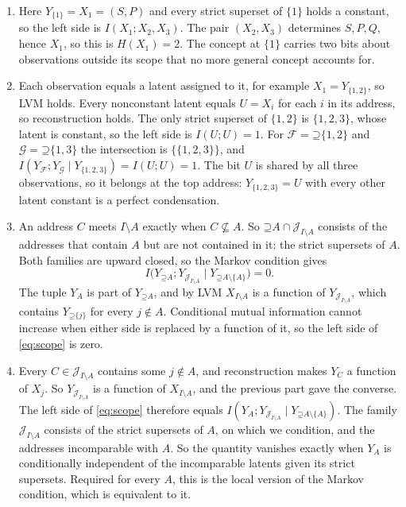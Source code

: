 \documentclass[11pt]{article}
\newcommand{\Up}{\mathord{\supseteq}}
\begin{document}
\begin{solution}[ex:scope]
\begin{enumerate}
\item Here $Y_{\{1\}}=X_1=(S,P)$ and every strict superset of $\{1\}$ holds a
constant, so the left side is $I(X_1;X_2,X_3)$. The pair $(X_2,X_3)$
determines $S,P,Q$, hence $X_1$, so this is $H(X_1)=2$. The concept at
$\{1\}$ carries two bits about observations outside its scope that no more
general concept accounts for.
\item Each observation equals a latent assigned to it, for example
$X_1=Y_{\{1,2\}}$, so LVM holds. Every nonconstant latent equals $U=X_i$ for
each $i$ in its address, so reconstruction holds. The only strict superset of
$\{1,2\}$ is $\{1,2,3\}$, whose latent is constant, so the left side is
$I(U;U)=1$. For $\mathcal{F}=\Up\{1,2\}$ and $\mathcal{G}=\Up\{1,3\}$ the
intersection is $\{\{1,2,3\}\}$, and
$I(Y_{\mathcal{F}};Y_{\mathcal{G}}\mid Y_{\{1,2,3\}})=I(U;U)=1$. The bit $U$ is
shared by all three observations, so it belongs at the top address:
$Y_{\{1,2,3\}}=U$ with every other latent constant is a perfect condensation.
\item An address $C$ meets $I\setminus A$ exactly when $C\not\subseteq A$.
So $\Up A\cap\mathcal{J}_{I\setminus A}$ consists of the addresses that contain
$A$ but are not contained in it: the strict supersets of $A$. Both families
are upward closed, so the Markov condition gives
\[
 I\bigl(Y_{\Up A};Y_{\mathcal{J}_{I\setminus A}}\mid Y_{\Up A\setminus\{A\}}\bigr)=0.
\]
The tuple $Y_A$ is part of $Y_{\Up A}$, and by LVM $X_{I\setminus A}$ is a
function of $Y_{\mathcal{J}_{I\setminus A}}$, which contains $Y_{\Up\{j\}}$ for
every $j\notin A$. Conditional mutual information cannot increase when either
side is replaced by a function of it, so the left side of \eqref{eq:scope} is
zero.
\item Every $C\in\mathcal{J}_{I\setminus A}$ contains some $j\notin A$, and
reconstruction makes $Y_C$ a function of $X_j$. So
$Y_{\mathcal{J}_{I\setminus A}}$ is a function of $X_{I\setminus A}$, and the previous part
gave the converse. The left side of \eqref{eq:scope} therefore equals
$I(Y_A;Y_{\mathcal{J}_{I\setminus A}}\mid Y_{\Up A\setminus\{A\}})$. The family
$\mathcal{J}_{I\setminus A}$ consists of the strict supersets of $A$, on which
we condition, and the addresses incomparable with $A$. So the quantity
vanishes exactly when $Y_A$ is conditionally independent of the incomparable
latents given its strict supersets. Required for every $A$, this is the local
version of the Markov condition, which is equivalent to it.
\end{enumerate}
\end{solution}
\end{document}
